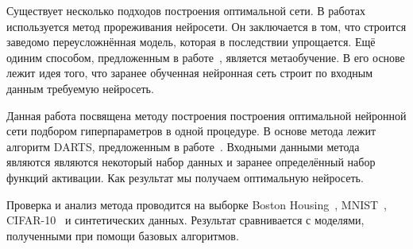 \documentclass[12pt,twoside]{article}
\begin{document}
	Существует несколько подходов построения оптимальной сети. В работах~\cite{cun1990, graves2011} используется метод прореживания нейросети. Он заключается в том, что строится заведомо переусложнённая модель, которая в последствии упрощается. Ещё одиним способом, предложенным в работе~\cite{Maclaurin:2015:GHO:3045118.3045343}, является метаобучение. В его основе лежит идея того, что заранее обученная нейронная сеть строит по входным данным требуемую нейросеть.
	
	Данная работа посвящена методу построения построения оптимальной нейронной сети подбором гиперпараметров в одной процедуре. В основе метода лежит алгоритм DARTS, предложенным в работе~\cite{liu2018darts}. Входными данными метода являются являются некоторый набор данных и заранее определённый набор функций активации. Как результат мы получаем оптимальную нейросеть.
	
	Проверка и анализ метода проводится на выборке Boston Housing~\cite{Boston}, MNIST~\cite{MNIST},  CIFAR-10~\cite{CIFAR-10} и синтетических данных. Результат сравнивается с моделями, полученными при помощи базовых алгоритмов.
	 



\end{document}
